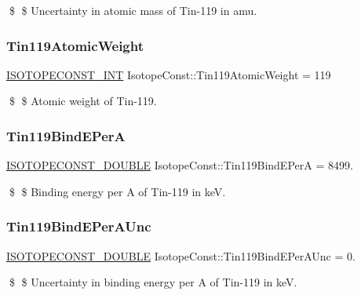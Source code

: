 \$ \$ Uncertainty in atomic mass of Tin-\/119 in amu. \mbox{\label{group___isotope_const-_tin-_sn119_gab3a7750cf9e80dd532b0a602e09d63d3}} 
\subsubsection{\texorpdfstring{Tin119\+Atomic\+Weight}{Tin119AtomicWeight}}
{\footnotesize\ttfamily \mbox{\hyperlink{group___isotope_const-_macros_ga5f18360b3e99483a35c32d789e62621c}{I\+S\+O\+T\+O\+P\+E\+C\+O\+N\+S\+T\+\_\+\+I\+NT}} Isotope\+Const\+::\+Tin119\+Atomic\+Weight = 119}

\$ \$ Atomic weight of Tin-\/119. \mbox{\label{group___isotope_const-_tin-_sn119_ga9d074b4e8445c5c6030e195303392d7c}} 
\subsubsection{\texorpdfstring{Tin119\+Bind\+E\+PerA}{Tin119BindEPerA}}
{\footnotesize\ttfamily \mbox{\hyperlink{group___isotope_const-_macros_ga8f45a7272ce02c0b4c65c44636ed719a}{I\+S\+O\+T\+O\+P\+E\+C\+O\+N\+S\+T\+\_\+\+D\+O\+U\+B\+LE}} Isotope\+Const\+::\+Tin119\+Bind\+E\+PerA = 8499.}

\$ \$ Binding energy per A of Tin-\/119 in keV. \mbox{\label{group___isotope_const-_tin-_sn119_gaecc0324d40657e6bccc4d8322d8e150d}} 
\subsubsection{\texorpdfstring{Tin119\+Bind\+E\+Per\+A\+Unc}{Tin119BindEPerAUnc}}
{\footnotesize\ttfamily \mbox{\hyperlink{group___isotope_const-_macros_ga8f45a7272ce02c0b4c65c44636ed719a}{I\+S\+O\+T\+O\+P\+E\+C\+O\+N\+S\+T\+\_\+\+D\+O\+U\+B\+LE}} Isotope\+Const\+::\+Tin119\+Bind\+E\+Per\+A\+Unc = 0.}

\$ \$ Uncertainty in binding energy per A of Tin-\/119 in keV. \mbox{\label{group___isotope_const-_tin-_sn119_gae0ab36aa172b700082dc7b13303cb25f}} 
